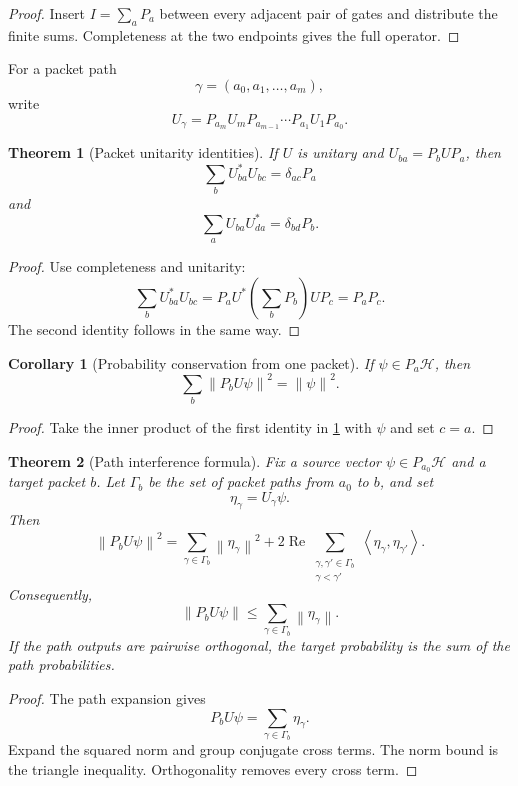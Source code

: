 \documentclass{aomart}
\newtheorem{theorem}{Theorem}[section]
\newtheorem{corollary}[corollary]{Corollary}
\theoremstyle{definition}
\theoremstyle{remark}
\newcommand{\Hcal}{\mathcal H}
\newcommand{\norm}[1]{\left\lVert#1\right\rVert}
\newcommand{\ip}[2]{\left\langle#1,#2\right\rangle}
\begin{document}
\begin{proof}
Insert \(I=\sum_aP_a\) between every adjacent pair of gates and distribute the finite sums. Completeness at the two endpoints gives the full operator.
\end{proof}

For a packet path
\[
\gamma=(a_0,a_1,\ldots,a_m),
\]
write
\[
U_\gamma
=
P_{a_m}U_mP_{a_{m-1}}
\cdots
P_{a_1}U_1P_{a_0}.
\]

\begin{theorem}[Packet unitarity identities]\label{thm:packet_unitarity}
If \(U\) is unitary and \(U_{ba}=P_bUP_a\), then
\[
\sum_bU_{ba}^*U_{bc}=\delta_{ac}P_a
\]
and
\[
\sum_aU_{ba}U_{da}^*=\delta_{bd}P_b.
\]
\end{theorem}

\begin{proof}
Use completeness and unitarity:
\[
\sum_bU_{ba}^*U_{bc}
=
P_aU^*\left(\sum_bP_b\right)UP_c
=P_aP_c.
\]
The second identity follows in the same way.
\end{proof}

\begin{corollary}[Probability conservation from one packet]\label{cor:packet_probability}
If \(\psi\in P_a\Hcal\), then
\[
\sum_b\norm{P_bU\psi}^2=\norm{\psi}^2.
\]
\end{corollary}

\begin{proof}
Take the inner product of the first identity in \cref{thm:packet_unitarity} with \(\psi\) and set \(c=a\).
\end{proof}

\begin{theorem}[Path interference formula]\label{thm:path_interference}
Fix a source vector \(\psi\in P_{a_0}\Hcal\) and a target packet \(b\). Let \(\Gamma_b\) be the set of packet paths from \(a_0\) to \(b\), and set
\[
\eta_\gamma=U_\gamma\psi.
\]
Then
\[
\norm{P_bU\psi}^2
=
\sum_{\gamma\in\Gamma_b}\norm{\eta_\gamma}^2
+
2\operatorname{Re}
\sum_{\substack{\gamma,\gamma'\in\Gamma_b\\ \gamma<\gamma'}}
\ip{\eta_\gamma}{\eta_{\gamma'}}.
\]
Consequently,
\[
\norm{P_bU\psi}
\leq
\sum_{\gamma\in\Gamma_b}\norm{\eta_\gamma}.
\]
If the path outputs are pairwise orthogonal, the target probability is the sum of the path probabilities.
\end{theorem}

\begin{proof}
The path expansion gives
\[
P_bU\psi=\sum_{\gamma\in\Gamma_b}\eta_\gamma.
\]
Expand the squared norm and group conjugate cross terms. The norm bound is the triangle inequality. Orthogonality removes every cross term.
\end{proof}
\end{document}
